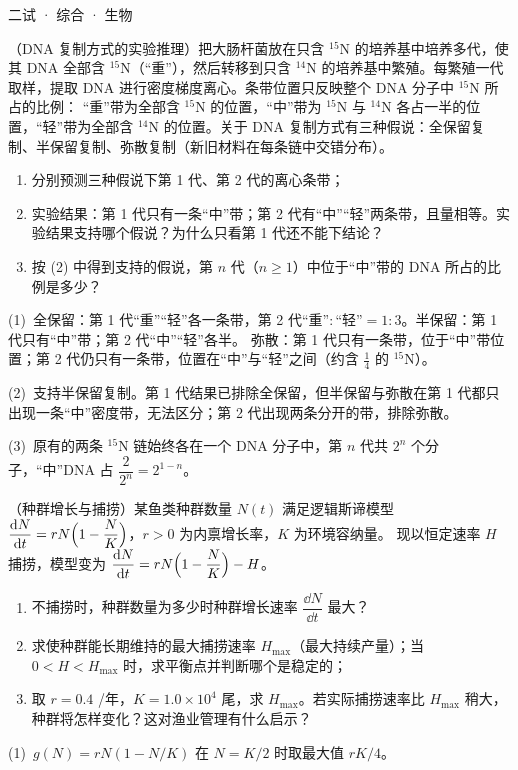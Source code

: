 \documentclass[cjk=noto, seal=first]{mojing-exam}
\begin{document}
\begin{paper}[time={建议 1.5 小时（训练设置）}, full=100]{二试 · 综合 · 生物}
\begin{questions}
\question[25]
（DNA 复制方式的实验推理）把大肠杆菌放在只含 $^{15}$N 的培养基中培养多代，使其 DNA 全部含 $^{15}$N（“重”），然后转移到只含 $^{14}$N
的培养基中繁殖。每繁殖一代取样，提取 DNA 进行密度梯度离心。条带位置只反映整个 DNA 分子中 $^{15}$N 所占的比例：
“重”带为全部含 $^{15}$N 的位置，“中”带为 $^{15}$N 与 $^{14}$N 各占一半的位置，“轻”带为全部含 $^{14}$N 的位置。关于 DNA 复制方式有三种假说：全保留复制、半保留复制、弥散复制（新旧材料在每条链中交错分布）。
\begin{enumerate}
  \item 分别预测三种假说下第 1 代、第 2 代的离心条带；
  \item 实验结果：第 1 代只有一条“中”带；第 2 代有“中”“轻”两条带，且量相等。实验结果支持哪个假说？为什么只看第 1 代还不能下结论？
  \item 按 (2) 中得到支持的假说，第 $n$ 代（$n\ge1$）中位于“中”带的 DNA 所占的比例是多少？
\end{enumerate}
\answerspace{2cm}
\begin{solution}
(1)~全保留：第 1 代“重”“轻”各一条带，第 2 代“重”$:$“轻”$=1:3$。半保留：第 1 代只有“中”带；第 2 代“中”“轻”各半。
弥散：第 1 代只有一条带，位于“中”带位置；第 2 代仍只有一条带，位置在“中”与“轻”之间（约含 $\frac14$ 的 $^{15}$N）。

(2)~支持半保留复制。第 1 代结果已排除全保留，但半保留与弥散在第 1 代都只出现一条“中”密度带，无法区分；第 2 代出现两条分开的带，排除弥散。

(3)~原有的两条 $^{15}$N 链始终各在一个 DNA 分子中，第 $n$ 代共 $2^n$ 个分子，“中”DNA 占 $\dfrac{2}{2^n}=2^{1-n}$。
\end{solution}

\question[25]
（种群增长与捕捞）某鱼类种群数量 $N(t)$ 满足逻辑斯谛模型 $\dfrac{\mathop{}\!\mathrm{d} N}{\mathop{}\!\mathrm{d} t}=rN\Bigl(1-\dfrac NK\Bigr)$，$r>0$ 为内禀增长率，$K$ 为环境容纳量。
现以恒定速率 $H$ 捕捞，模型变为 $\dfrac{\mathop{}\!\mathrm{d} N}{\mathop{}\!\mathrm{d} t}=rN\Bigl(1-\dfrac NK\Bigr)-H$。
\begin{enumerate}
  \item 不捕捞时，种群数量为多少时种群增长速率 $\dfrac{\dd N}{\dd t}$ 最大？
  \item 求使种群能长期维持的最大捕捞速率 $H_{\max}$（最大持续产量）；当 $0<H<H_{\max}$ 时，求平衡点并判断哪个是稳定的；
  \item 取 $r=0.4$ /年，$K=1.0\times10^4$ 尾，求 $H_{\max}$。若实际捕捞速率比 $H_{\max}$ 稍大，种群将怎样变化？这对渔业管理有什么启示？
\end{enumerate}
\answerspace{2cm}
\begin{solution}
(1)~$g(N)=rN(1-N/K)$ 在 $N=K/2$ 时取最大值 $rK/4$。


\end{solution}
\end{questions}
\end{paper}
\end{document}
